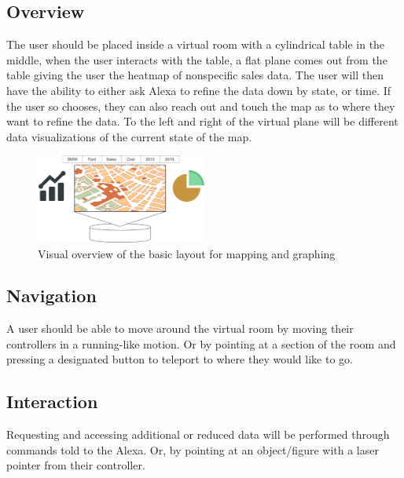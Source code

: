 \documentclass[onecolumn, draftclsnofoot,10pt, compsoc]{IEEEtran}
\begin{document}
    \subsection{Overview}
        The user should be placed inside a virtual room with a cylindrical table in the middle, when the user interacts with the table, a flat plane comes out from the table giving the user the heatmap of nonspecific sales data. The user will then have the ability to either ask Alexa to refine the data down by state, or time. If the user so chooses, they can also reach out and touch the map as to where they want to refine the data. 
        To the left and right of the virtual plane will be different data visualizations of the current state of the map.
        \begin{figure}
            \centering
            \includegraphics[width=0.5\textwidth]{Basic_interaction.eps}
            \caption{Visual overview of the basic layout for mapping and graphing}
            \label{fig:Data visualization layout}
        \end{figure}
    
    \subsection{Navigation}
        A user should be able to move around the virtual room by moving their controllers in a running-like motion. Or by pointing at a section of the room and pressing a designated button to teleport to where they would like to go.
    
    \subsection{Interaction}
        Requesting and accessing additional or reduced data will be performed through commands told to the Alexa. Or, by pointing at an object/figure with a laser pointer from their controller.
\end{document}
